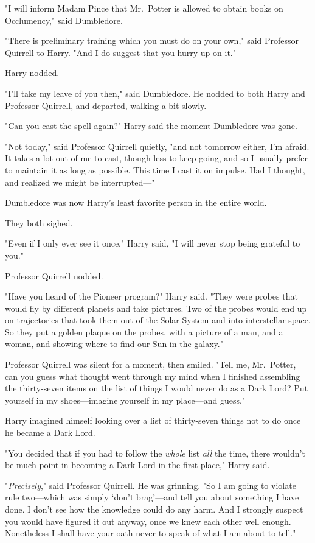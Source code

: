 "I will inform Madam Pince that Mr.~Potter is allowed to obtain books on
Occlumency," said Dumbledore.

"There is preliminary training which you must do on your own," said Professor
Quirrell to Harry. "And I do suggest that you hurry up on it."

Harry nodded.

"I'll take my leave of you then," said Dumbledore. He nodded to both Harry and
Professor Quirrell, and departed, walking a bit slowly.

"Can you cast the spell again?" Harry said the moment Dumbledore was gone.

"Not today," said Professor Quirrell quietly, "and not tomorrow either, I'm
afraid. It takes a lot out of me to cast, though less to keep going, and so I
usually prefer to maintain it as long as possible. This time I cast it on
impulse. Had I thought, and realized we might be interrupted—"

Dumbledore was now Harry's least favorite person in the entire world.

They both sighed.

"Even if I only ever see it once," Harry said, "I will never stop being
grateful to you."

Professor Quirrell nodded.

"Have you heard of the Pioneer program?" Harry said. "They were probes that
would fly by different planets and take pictures. Two of the probes would end
up on trajectories that took them out of the Solar System and into interstellar
space. So they put a golden plaque on the probes, with a picture of a man, and
a woman, and showing where to find our Sun in the galaxy."

Professor Quirrell was silent for a moment, then smiled. "Tell me, Mr.~Potter,
can you guess what thought went through my mind when I finished assembling the
thirty-seven items on the list of things I would never do as a Dark Lord? Put
yourself in my shoes—imagine yourself in my place—and guess."

Harry imagined himself looking over a list of thirty-seven things not to do
once he became a Dark Lord.

"You decided that if you had to follow the \emph{whole} list \emph{all} the
time, there wouldn't be much point in becoming a Dark Lord in the first place,"
Harry said.

"\emph{Precisely}," said Professor Quirrell. He was grinning. "So I am going to
violate rule two—which was simply `don't brag'—and tell you about something
I have done. I don't see how the knowledge could do any harm. And I strongly
suspect you would have figured it out anyway, once we knew each other well
enough. Nonetheless{\el} I shall have your oath never to speak of what I am
about to tell."

